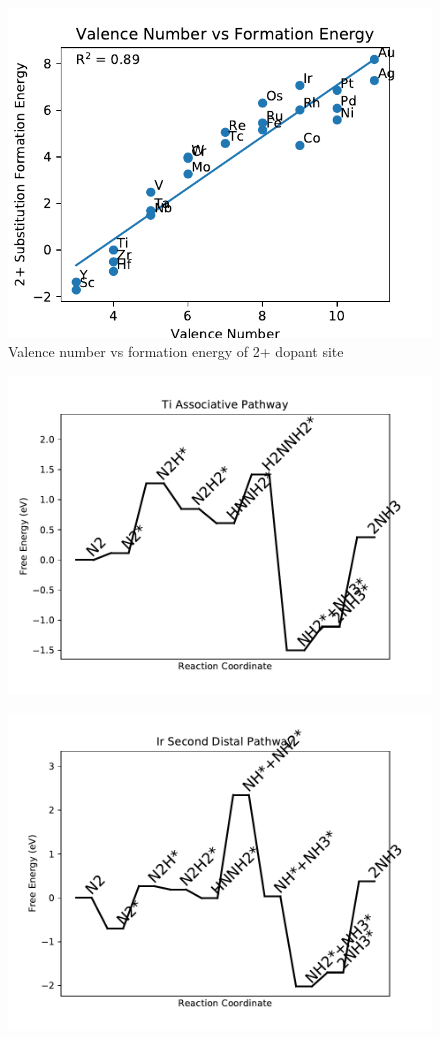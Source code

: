 \begin{figure}
\centering
\includegraphics[width=0.8\linewidth]{Images/Valence_vs_formation_energy.pdf}
\caption{Valence number vs formation energy of 2+ dopant site}
\end{figure}

\begin{figure}
\centering
\includegraphics[width=0.8\linewidth]{data/plots/Ti_associative.pdf}
\end{figure}

\begin{figure}
\centering
\includegraphics[width=0.8\linewidth]{data/plots/Ir_distal_2.pdf}
\end{figure}

